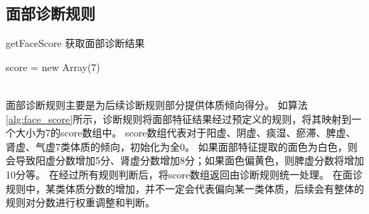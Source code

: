 %
%


\subsection{面部诊断规则}

\begin{algorithm}[htbp]
    \caption{getFaceScore 获取面部诊断结果\cite{张红凯2018基于舌}}%
    \label{alg:face_score}
    \LinesNumbered %
    score = new Array(7) \\

    \\
\end{algorithm}

面部诊断规则主要是为后续诊断规则部分提供体质倾向得分。
如算法\ref{alg:face_score}所示，诊断规则将面部特征结果经过预定义的规则，将其映射到一个大小为7的score数组中。
score数组代表对于阳虚、阴虚、痰湿、瘀滞、脾虚、肾虚、气虚7类体质的倾向，初始化为全0。
如果面部特征提取的面色为白色，则会导致阳虚分数增加5分、肾虚分数增加8分；如果面色偏黄色，则脾虚分数将增加10分等。
在经过所有规则判断后，将score数组返回由诊断规则统一处理。
在面诊规则中，某类体质分数的增加，并不一定会代表偏向某一类体质，后续会有整体的规则对分数进行权重调整和判断。


